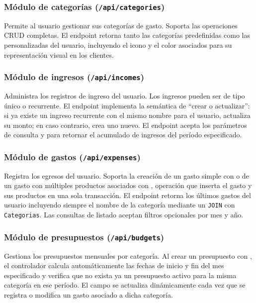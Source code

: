 \subsubsection{Módulo de categorías (\texttt{/api/categories})}

Permite al usuario gestionar sus categorías de gasto. Soporta las
operaciones CRUD completas. El endpoint  retorna tanto
las categorías predefinidas como las personalizadas del usuario,
incluyendo el icono y el color asociados para su representación visual
en los clientes.

\subsubsection{Módulo de ingresos (\texttt{/api/incomes})}

Administra los registros de ingreso del usuario. Los ingresos pueden
ser de tipo único o recurrente. El endpoint
 implementa la semántica de
``crear o actualizar'': si ya existe un ingreso recurrente con el
mismo nombre para el usuario, actualiza su monto; en caso contrario,
crea uno nuevo. El endpoint  acepta los
parámetros de consulta  y  para retornar
el acumulado de ingresos del período especificado.

\subsubsection{Módulo de gastos (\texttt{/api/expenses})}

Registra los egresos del usuario. Soporta la creación de un gasto
simple con  o de un gasto con múltiples productos
asociados con , operación que inserta
el gasto y sus productos en una sola transacción. El endpoint
 retorna los últimos gastos del usuario
incluyendo siempre el nombre de la categoría mediante un
\texttt{JOIN} con \texttt{Categorias}. Las consultas de listado
aceptan filtros opcionales por mes y año.

\subsubsection{Módulo de presupuestos (\texttt{/api/budgets})}

Gestiona los presupuestos mensuales por categoría. Al crear un
presupuesto con , el controlador calcula
automáticamente las fechas de inicio y fin del mes especificado
y verifica que no exista ya un presupuesto activo para la misma
categoría en ese período. El campo  se
actualiza dinámicamente cada vez que se registra o modifica un gasto
asociado a dicha categoría.

